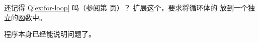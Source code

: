 \begin{Exercise}[title={For-loop II},difficulty=1]
\label{ex:for-loop II}
\Question 还记得 Q\ref{ex:for-loop} 吗（参阅第 \pageref{ex;for-loop} 页）？
扩展这个，要求将循环体的  放到一个独立的函数中。
\end{Exercise}

\begin{Answer}
\begin{minipage}{\textwidth}

\end{minipage}
程序本身已经能说明问题了。
\end{Answer}
